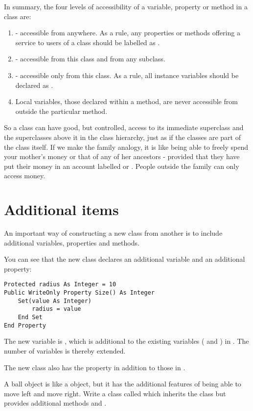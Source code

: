 		In summary, the four levels of accessibility of a variable, property or method in a class are:
		\begin{enumerate}
			\item {} - accessible from anywhere. As a rule, any properties or methods offering a service to users of a class should be labelled as .
			\item	{} - accessible from this class and from any subclass.
			\item	{} - accessible only from this class. As a rule, all instance variables should be declared as .
			\item Local variables, those declared within a method, are never accessible from outside the particular method.
		\end{enumerate}
		So a class can have good, but controlled, access to its immediate superclass and the superclasses above it in the class hierarchy, just as if the classes are part of the class itself. If we make the family analogy, it is like being able to freely spend your mother's money or that of any of her ancestors - provided that they have put their money in an account labelled  or . People outside the family can only access  money.


	\section{Additional items}
		An important way of constructing a new class from another is to include additional variables, properties and methods.
		
		You can see that the new class  declares an additional variable and an additional property:
		\begin{lstlisting}
Protected radius As Integer = 10
Public WriteOnly Property Size() As Integer
	Set(value As Integer)
		radius = value
	End Set
End Property
		\end{lstlisting}
		The new variable is , which is additional to the existing variables ( and ) in . The number of variables is thereby extended.
		
		The new class also has the property  in addition to those in .

	\begin{stqb}
		\begin{STQ}
			\item	A ball object is like a  object, but it has the additional features of being able to move left and move right. Write a class called  which inherits the class  but provides additional methods  and .
		\end{STQ}
	\end{stqb}

